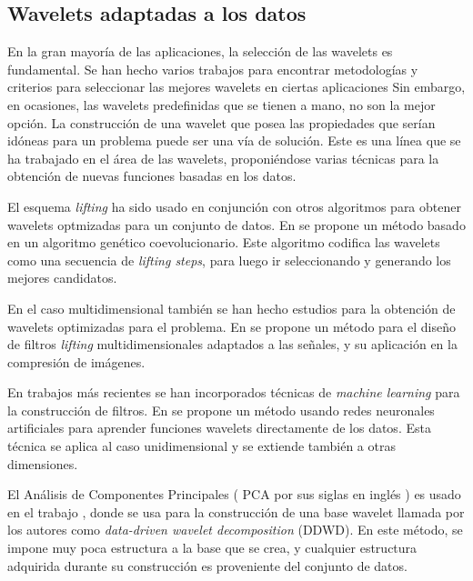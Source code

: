 \subsection{Wavelets adaptadas a los datos}\label{adapted-wavelets}

En la gran mayoría de las aplicaciones, la selección de las wavelets es fundamental. Se han hecho varios trabajos
para encontrar metodologías y criterios para seleccionar las mejores wavelets en ciertas aplicaciones \cite{ngui2013} \cite{doi:10.1177/14759217211010261} 
Sin embargo, en ocasiones, las wavelets predefinidas que se tienen a mano, no son la mejor opción.
La construcción de una wavelet que posea las propiedades que serían idóneas para un problema puede ser una
vía de solución. Este es una línea que se ha trabajado en el área de las wavelets, proponiéndose varias
técnicas para la obtención de nuevas funciones basadas en los datos.

El esquema \textit{lifting} ha sido usado en conjunción con otros algoritmos para obtener wavelets optmizadas para un conjunto de datos.
En \cite{Grasemann2004} se propone un método basado en un algoritmo genético coevolucionario. Este algoritmo codifica las wavelets
como una secuencia de \textit{lifting steps}, para luego ir seleccionando y generando los mejores 
candidatos.

En el caso multidimensional también se han hecho estudios para la obtención de wavelets optimizadas para el problema.
En \cite{Gouze2004} se propone un método para el diseño de filtros \textit{lifting} multidimensionales adaptados a las señales, y  
su aplicación en la compresión de imágenes.

En trabajos más recientes se han incorporados técnicas de \textit{machine learning} para la construcción de filtros.
En \cite{Recoskie2018LearningSO} se propone un método usando redes neuronales artificiales para aprender funciones 
wavelets directamente de los datos. Esta técnica se aplica al caso unidimensional y se extiende también a otras 
dimensiones.

El Análisis de Componentes Principales ( PCA por sus siglas en inglés ) es usado en el trabajo \cite{floryan}, donde
se usa para la construcción de una base wavelet llamada por los autores como \textit{ data-driven wavelet decomposition } 
(DDWD). En este método, se impone muy poca estructura a la base que se crea, y cualquier estructura adquirida durante su construcción
es proveniente del conjunto de datos.

